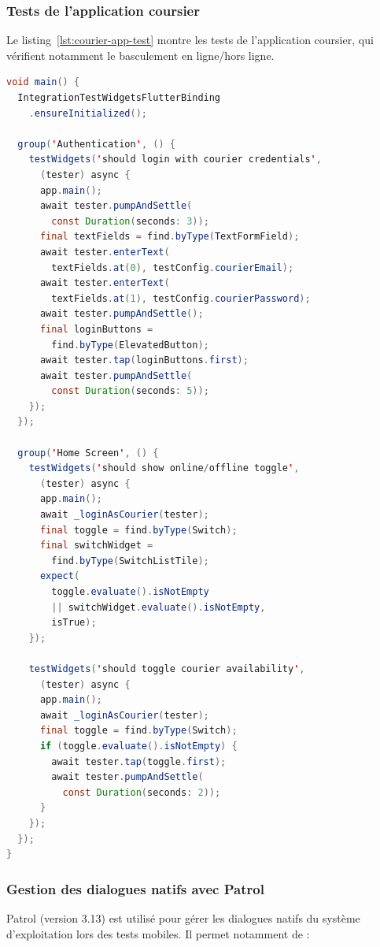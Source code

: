\subsubsection{Tests de l'application coursier}

Le listing~\ref{lst:courier-app-test} montre les tests de l'application coursier,
qui vérifient notamment le basculement en ligne/hors ligne.

\begin{lstlisting}[language=Java, caption={Tests d'intégration -- courier\_app/app\_test.dart}, label={lst:courier-app-test}]
void main() {
  IntegrationTestWidgetsFlutterBinding
    .ensureInitialized();

  group('Authentication', () {
    testWidgets('should login with courier credentials',
      (tester) async {
      app.main();
      await tester.pumpAndSettle(
        const Duration(seconds: 3));
      final textFields = find.byType(TextFormField);
      await tester.enterText(
        textFields.at(0), testConfig.courierEmail);
      await tester.enterText(
        textFields.at(1), testConfig.courierPassword);
      await tester.pumpAndSettle();
      final loginButtons =
        find.byType(ElevatedButton);
      await tester.tap(loginButtons.first);
      await tester.pumpAndSettle(
        const Duration(seconds: 5));
    });
  });

  group('Home Screen', () {
    testWidgets('should show online/offline toggle',
      (tester) async {
      app.main();
      await _loginAsCourier(tester);
      final toggle = find.byType(Switch);
      final switchWidget =
        find.byType(SwitchListTile);
      expect(
        toggle.evaluate().isNotEmpty
        || switchWidget.evaluate().isNotEmpty,
        isTrue);
    });

    testWidgets('should toggle courier availability',
      (tester) async {
      app.main();
      await _loginAsCourier(tester);
      final toggle = find.byType(Switch);
      if (toggle.evaluate().isNotEmpty) {
        await tester.tap(toggle.first);
        await tester.pumpAndSettle(
          const Duration(seconds: 2));
      }
    });
  });
}
\end{lstlisting}

\subsubsection{Gestion des dialogues natifs avec Patrol}

Patrol (version 3.13) est utilisé pour gérer les dialogues natifs du système
d'exploitation lors des tests mobiles. Il permet notamment de :

